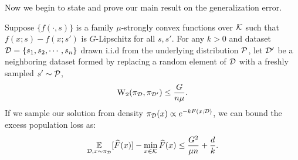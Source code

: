 Now we begin to state and prove our main result on the generalization error.
\begin{theorem}
\label{thm:generalization_error}
Suppose $\{f(\cdot,s)\}$ is a family $\mu$-strongly convex functions over $\mathcal K$ such that $f(x;s)-f(x;s')$ is $G$-Lipschitz for all $s,s'$.
For any $k>0$ and dataset $\mathcal D=\{s_1,s_2,\cdots,s_n\}$ drawn i.i.d from the underlying distribution $\mathcal P$, let $\mathcal D'$ be a neighboring dataset formed by replacing a random element of $\mathcal D$ with a freshly sampled $s'\sim \mathcal P$,
\begin{align*}
    \mathrm{W}_{2}(\pi_\mathcal D,\pi_{\mathcal D'})\leq \frac{G}{n\mu}.
\end{align*}
If we sample our solution from density $\pi_\mathcal D(x) \propto e^{-kF(x;\mathcal D)}$, we can bound the excess population loss as:
\begin{align*}
    \operatorname*{\mathbb{E}}_{\mathcal D,x\sim \pi_\mathcal D}[\widehat{F}(x)]-\min_{x\in\mathcal K}\widehat{F}(x)\leq \frac{G^2}{\mu n}+ \frac{d}{k}.
\end{align*}
\end{theorem}

